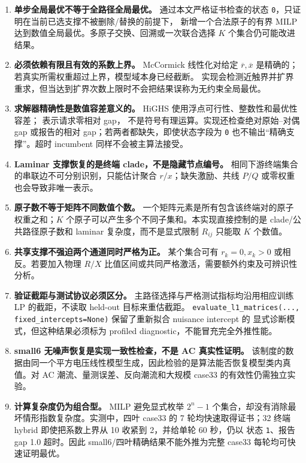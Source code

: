 \documentclass[UTF8,11pt]{ctexart}
\begin{document}
\begin{enumerate}
  \item \textbf{单步全局最优不等于全路径全局最优。}
  通过本文严格证书检查的状态 \texttt{0}，只证明在当前已选支撑不被删除/替换的前提下，
  新增一个合法原子的有界 MILP 达到数值全局最优。多原子交换、回溯或一次联合选择 $K$ 个集合仍可能改进结果。

  \item \textbf{必须依赖有限且有效的系数上界。}
  McCormick 线性化对给定 $\overline r,\overline x$ 是精确的；若真实所需权重超过上界，模型域本身已经截断。
  实现会检测近触界并扩界重求，但当达到扩界次数上限时不会把结果误称为无约束全局最优。

  \item \textbf{求解器精确性是数值容差意义的。}
  HiGHS 使用浮点可行性、整数性和最优性容差； 表示请求零相对 gap，
  不是符号有理运算。实现还检查绝对原始--对偶 gap 或报告的相对 gap；若两者都缺失，即使状态字段为
  \texttt{0} 也不输出“精确支撑”。超时 incumbent 同样不会被主算法接受。

  \item \textbf{Laminar 支撑恢复的是终端 clade，不是隐藏节点编号。}
  相同下游终端集合的串联边不可分别识别，只能估计聚合 $r/x$；缺失激励、共线 $P/Q$ 或零权重也会导致非唯一表示。

  \item \textbf{原子数不等于矩阵不同数值个数。}
  一个矩阵元素是所有包含该终端对的原子权重之和；$K$ 个原子可以产生多个不同子集和。本实现直接控制的是
  clade/公共路径原子数和 laminar 复杂度，而不是显式限制 $R_{ij}$ 只能取 $K$ 个数值。

  \item \textbf{共享支撑不强迫两个通道同时严格为正。}
  某个集合可有 $r_k=0,x_k>0$ 或相反。若要加入物理 $R/X$ 比值区间或共同严格激活，需要额外约束及可辨识性分析。

  \item \textbf{验证截距与测试协议必须区分。}
  主路径选择与严格测试指标均沿用相应训练 LP 的截距，不读取 held-out 目标来重估截距。
  \texttt{evaluate\_l1\_matrices(..., fixed\_intercepts=None)} 保留了重新拟合 nuisance intercept 的
  显式诊断模式，但这种结果必须标为 profiled diagnostic，不能冒充完全外推性能。

  \item \textbf{small6 无噪声恢复是实现一致性检查，不是 AC 真实性证明。}
  该制度的数据由同一个平方电压线性模型生成，因此检验的是算法能否恢复模型类内真值。对 AC 潮流、量测误差、反向潮流和大规模 case33
  的有效性仍需独立实验。

  \item \textbf{计算复杂度仍为组合型。}
  MILP 避免显式枚举 $2^n-1$ 个集合，却没有消除最坏情形指数复杂度。实测中，四叶 case33 的
  7 轮均快速取得证书；32 终端 hybrid 即使把系数上界从 10 收紧到 2，并给单轮 60 秒，仍以
  状态 \texttt{1}、报告 gap 1.0 超时。因此 small6/四叶精确结果不能外推为完整 case33 每轮均可快速证明最优。
\end{enumerate}
\end{document}
